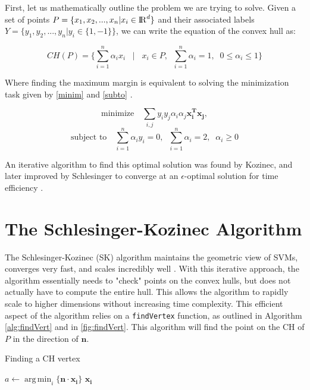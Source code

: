 \documentclass[11pt]{article}
\theoremstyle{remark}	  \newtheorem*{remark}{Remark}
\DeclareMathOperator*{\argmin}{arg\,min}
\numberwithin{equation}{section}
\begin{document}
First, let us mathematically outline the problem we are trying to solve. Given a set of points $P = \{x_{1}, x_{2}, ..., x_{n} | x_{i}\in{\rm I\!R}^{d}\}$ and their associated labels $Y = \{y_{1}, y_{2}, ..., y_{n} | y_{i}\in \{1,-1\}\}$, we can write the equation of the convex hull as:

\begin{equation}
CH(P) = \Bigg \lbrace \sum_{i=1}^{n} \alpha_{i}x_{i} \;\;\; \Bigg \vert \;\;\; x_{i} \in P,\;\; \sum_{i=1}^{n} \alpha_{i} = 1,\;\; 0 \leq \alpha_{i} \leq 1 \Bigg \rbrace
\end{equation}

Where finding the maximum margin is equivalent to solving the minimization task given by \ref{minim} and \ref{subto} \cite{theodoridis_reduced_2007}.

\begin{equation}
\textrm{minimize} \quad \sum_{i,j} y_{i}y_{j} \alpha_{i} \alpha_{j} \mathbf{x_{i}^{T} x_{j}},
\label{minim}
\end{equation}
\begin{equation}
\textrm{subject to} \quad \sum_{i=1}^{n} \alpha_{i}y_{i} = 0, \;\; \sum_{i=1}^{n} \alpha_{i}=2, \;\; \alpha_{i} \geq 0
\label{subto}
\end{equation}

An iterative algorithm to find this optimal solution was found by Kozinec, and later improved by Schlesinger to converge at an $\epsilon$-optimal solution for time efficiency \cite{franc_iterative_2003}.

\section{The Schlesinger-Kozinec Algorithm}

The Schlesinger-Kozinec (SK) algorithm maintains the geometric view of SVMs, converges very fast, and scales incredibly well \cite{goodrich_training_2011}. With this iterative approach, the algorithm essentially needs to "check" points on the convex hulls, but does not actually have to compute the entire hull. This allows the algorithm to rapidly scale to higher dimensions without increasing time complexity. This efficient aspect of the algorithm relies on a \texttt{findVertex} function, as outlined in Algorithm \ref{alg:findVert} and in \ref{fig:findVert}. This algorithm will find the point on the CH of $P$ in the direction of $\mathbf{n}$.

\begin{algorithm}
\caption{Finding a CH vertex}\label{euclid}
\begin{algorithmic}[1]
    \State $a \gets \argmin_{i} \{\mathbf{n \cdot x_{i}} \}$
    \State \Return $\mathbf{x_{i}}$
\EndFunction
\end{algorithmic}
\label{alg:findVert}
\end{algorithm}
\end{document}
